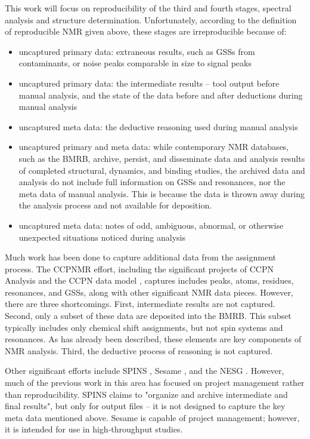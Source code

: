This work will focus on reproducibility of the third and fourth stages, 
spectral analysis and structure determination.  Unfortunately, according to 
the definition of reproducible NMR given above, these stages are irreproducible 
because of:
\begin{itemize}
  \item uncaptured primary data: extraneous results, such as GSSs from 
  contaminants, or noise peaks comparable in size to signal peaks
  \item uncaptured primary data: the intermediate results -- tool output before 
  manual analysis, and the state of the data before and after deductions during 
  manual analysis
  \item uncaptured meta data:  the deductive reasoning used during manual analysis
  \item uncaptured primary and meta data: while contemporary NMR databases, 
  such as the BMRB, archive, persist, and disseminate data and analysis 
  results of completed structural, dynamics, and binding studies, the 
  archived data and analysis do not include full information on GSSs 
  and resonances, nor the meta data of manual analysis.  This is because the 
  data is thrown away during the analysis process and not available for deposition.
  \item uncaptured meta data: notes of odd, ambiguous, abnormal, or 
  otherwise unexpected situations noticed during analysis
\end{itemize}

Much work has been done to capture additional data from the assignment process.  
The CCPNMR effort, including the significant projects of CCPN Analysis and the 
CCPN data model \cite{ccpn}, captures includes peaks, atoms, residues, 
resonances, and GSSs, along with other significant NMR data pieces.  
However, there are three shortcomings.  First, intermediate results are not 
captured.  Second, only a subset of these data are deposited into the BMRB.  
This subset typically includes only chemical shift assignments, but not spin 
systems and resonances.   As has already been described, these elements are 
key components of NMR analysis.  Third, the deductive process of reasoning 
is not captured.

Other significant efforts include SPINS \cite{baran2006spins}, 
Sesame \cite{sesame}, and 
the NESG \cite{nesg2005nmr}.  However, much of the previous 
work in this area has focused on project management rather than reproducibility.
SPINS claims to "organize and archive intermediate and final results", but 
only for output files -- it is not designed to capture the key meta data
mentioned above.  Sesame is capable of project management; however, it is 
intended for use in high-throughput studies.  

